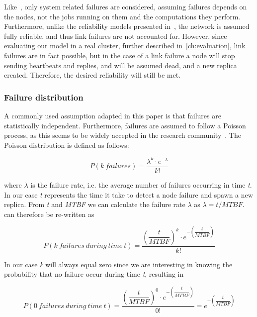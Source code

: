 \documentclass{cslthse-msc}
\begin{document}
Like~\cite{selfAdaptRel}, only system related failures are considered, assuming failures depends on the nodes, not the jobs running on them and the computations they perform. Furthermore, unlike the reliability models presented in~\cite{taskSchedulingReplication, taskAllocationSwarm, relAnalysisFRA}, the network is assumed fully reliable, and thus link failures are not accounted for. However, since evaluating our model in a real cluster, further described in~\cref{ch:evaluation}, link failures are in fact possible, but in the case of a link failure a node will stop sending heartbeats and replies, and will be assumed dead, and a new replica created. Therefore, the desired reliability will still be met. 

\subsubsection{Failure distribution}
A commonly used assumption adapted in this paper is that failures are statistically independent. Furthermore, failures are assumed to follow a Poisson process, as this seems to be widely accepted in the research community~\cite{experimentalFailureAssessment}. The Poisson distribution is defined as follows:

\begin{equation} \label{eq:Poisson}
P(k\ failures) = \dfrac{\lambda^k \cdot e^{-\lambda}}{k!}
\end{equation}

where $\lambda$ is the failure rate, i.e. the average number of failures occurring in time \emph{t}. In our case \emph{t} represents the time it take to detect a node failure and spawn a new replica. From \emph{t} and \emph{MTBF} we can calculate the failure rate $\lambda$ as $\lambda = t/MTBF$.  can therefore be re-written as

\begin{equation} \label{eq:Poisson_during_time_t}
P(k\ failures\ during\ time\ t) = \dfrac{\left(\dfrac{t}{MTBF}\right)^k \cdot e^{-\left(\dfrac{t}{MTBF}\right)}}{k!}
\end{equation}

In our case \emph{k} will always equal zero since we are interesting in knowing the probability that no failure occur during time \emph{t}, resulting in

\begin{equation} \label{eq:Poisson_no_failures}
P(0\ failures\ during\ time\ t) = \dfrac{\left(\dfrac{t}{MTBF}\right)^0 \cdot e^{-\left(\dfrac{t}{MTBF}\right)}}{0!} = e^{-\left(\dfrac{t}{MTBF}\right)}
\end{equation}
\end{document}
